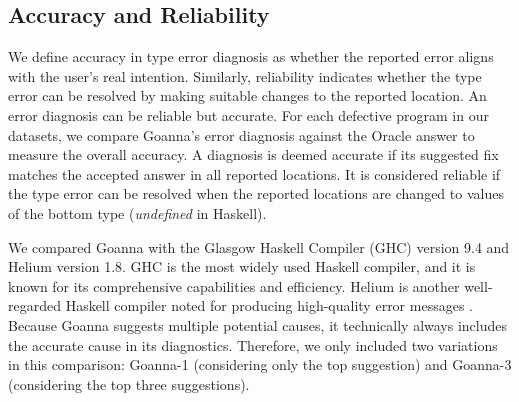 \documentclass[pdflatex,lineno,sn-nature,Numbered]{sn-jnl}%
\begin{document}
\subsection{Accuracy and Reliability} \label{sub:eval-accuracy}

We define accuracy in type error diagnosis as whether the reported error aligns with the user's real intention. Similarly, reliability indicates whether the type error can be resolved by making suitable changes to the reported location. An error diagnosis can be reliable but accurate. For each defective program in our datasets, we compare Goanna's error diagnosis against the Oracle answer to measure the overall accuracy. A diagnosis is deemed accurate if its suggested fix matches the accepted answer in all reported locations. It is considered reliable if the type error can be resolved when the reported locations are changed to values of the bottom type (\textit{undefined} in Haskell).

We compared Goanna with the Glasgow Haskell Compiler (GHC) version 9.4 \cite{Gamari_undated-zu} and Helium \cite{Hage2023-kk} version 1.8. GHC is the most widely used Haskell compiler, and it is known for its comprehensive capabilities and efficiency. Helium is another well-regarded Haskell compiler noted for producing high-quality error messages \cite{Heeren2003-kd}. Because Goanna suggests multiple potential causes, it technically always includes the accurate cause in its diagnostics. Therefore, we only included two variations in this comparison: Goanna-1 (considering only the top suggestion) and Goanna-3 (considering the top three suggestions).
\end{document}
